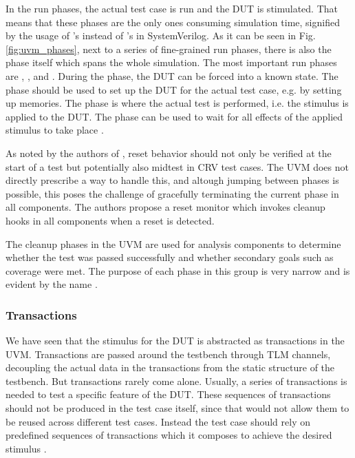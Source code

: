 In the run phases, the actual test case is run and the DUT is stimulated. That means that these phases are the only
ones consuming simulation time, signified by the usage of 's instead of 's in SystemVerilog.
As it can be seen in Fig. \ref{fig:uvm_phases}, next to a series of fine-grained run phases, there is also the
 phase itself which spans the whole simulation. The most important run phases are ,
,  and . During the  phase, the DUT can be forced into a known
state. The  phase should be used to set up the DUT for the actual test case, e.g. by setting up
memories. The  phase is where the actual test is performed, i.e. the stimulus is applied to the DUT. The
 phase can be used to wait for all effects of the applied stimulus to take place \cite[ch. 4.6]{mehta2018asic}.

As noted by the authors of \cite{dvcon2014reset}, reset behavior should not only be verified at the start of a test
but potentially also midtest in CRV test cases. The UVM does not directly prescribe a way to handle this, and altough
jumping between phases is possible, this poses the challenge of gracefully terminating the current phase in all
components. The authors propose a reset monitor which invokes cleanup hooks in all components when a reset is detected.

The cleanup phases in the UVM are used for analysis components to determine whether the test was passed successfully
and whether secondary goals such as coverage were met. The purpose of each phase in this group is very narrow and is
evident by the name \cite[ch. 4.6]{mehta2018asic}.

\subsubsection{Transactions} %

We have seen that the stimulus for the DUT is abstracted as transactions in the UVM. Transactions are passed around
the testbench through TLM channels, decoupling the actual data in the transactions from the static structure of the
testbench. But transactions rarely come alone. Usually, a series of transactions is needed to test a specific feature
of the DUT. These sequences of transactions should not be produced in the test case itself, since that would not
allow them to be reused across different test cases. Instead the test case should rely on predefined sequences of
transactions which it composes to achieve the desired stimulus \cite[Ch. 23]{salemi2013uvm}.

